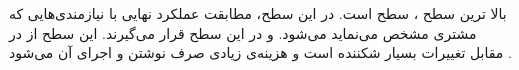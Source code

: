 
بالا ترین سطح ، سطح  است. در این سطح،
مطابقت عملکرد نهایی  با نیازمندی‌هایی که مشتری مشخص می‌نماید
 می‌شود.  و  در این سطح
قرار می‌گیرند. این سطح از  در مقابل تغییرات بسیار شکننده است
و هزینه‌ی زیادی صرف نوشتن و اجرای آن می‌شود .

